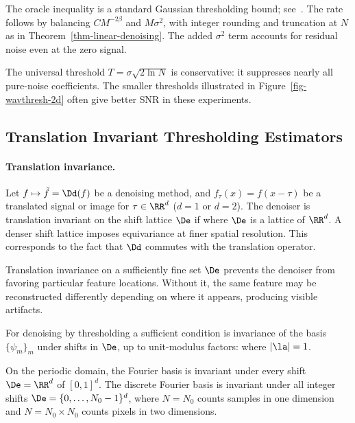 The oracle inequality is a standard Gaussian thresholding bound; see~\cite{donoho-shrinkage}. The rate follows by balancing $CM^{-2\beta}$ and $M\sigma^2$, with integer rounding and truncation at $N$ as in Theorem~\ref{thm-linear-denoising}. The added $\sigma^2$ term accounts for residual noise even at the zero signal.

The universal threshold $T=\sigma\sqrt{2\ln N}$ is conservative: it suppresses nearly all pure-noise coefficients. The smaller thresholds illustrated in Figure~\ref{fig-wavthresh-2d} often give better SNR in these experiments.

\subsection{Translation Invariant Thresholding Estimators}

\paragraph{Translation invariance.}

Let $f\mapsto\tilde f=\Dd(f)$ be a denoising method, and $f_\tau(x) = f(x-\tau)$ be a translated signal or image for $\tau \in \RR^d$ ($d=1$ or $d=2$).
The denoiser is translation invariant on the shift lattice $\De$ if
where $\De$ is a lattice of $\RR^d$. A denser shift lattice imposes equivariance at finer spatial resolution.
This corresponds to the fact that $\Dd$ commutes with the translation operator.
\begin{center}
\end{center}
Translation invariance on a sufficiently fine set $\De$ prevents the denoiser from favoring particular feature locations. Without it, the same feature may be reconstructed differently depending on where it appears, producing visible artifacts.

For denoising by thresholding 
a sufficient condition is invariance of the basis $\{\psi_m\}_m$ under shifts in $\De$, up to unit-modulus factors:
where $|\la|=1$.

On the periodic domain, the Fourier basis is invariant under every shift $\De=\RR^d$ of $[0,1]^d$. The discrete Fourier basis is invariant under all integer shifts $\De=\{0,\ldots,N_0-1\}^d$, where $N=N_0$ counts samples in one dimension and $N=N_0 \times N_0$ counts pixels in two dimensions.

